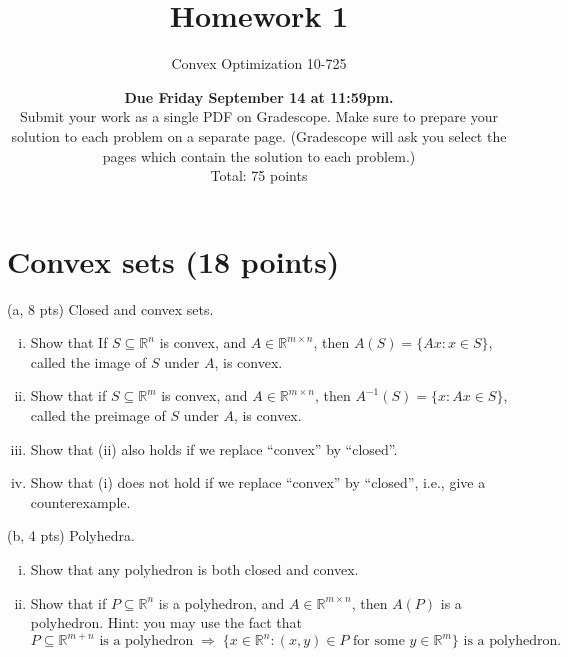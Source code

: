 \documentclass{article}
\theoremstyle{remark}
\theoremstyle{definition}
\def\R{\mathbb{R}}
\begin{document}
\title{Homework 1}
\author{\Large Convex Optimization 10-725}
\date{{\bf Due Friday September 14 at 11:59pm.} \\
\bigskip
Submit your work as a single PDF on Gradescope. Make sure to prepare your
solution to each problem on a separate page. (Gradescope will ask you select the
pages which contain the solution to each problem.) \\  
\bigskip 
Total: 75 points}
\maketitle

\section{Convex sets (18 points)}

\noindent
(a, 8 pts) Closed and convex sets. 

\begin{enumerate}[i.]
\item Show that If $S\subseteq \R^n$ is convex, and $A \in \R^{m \times n}$,
  then $A(S) = \{ Ax : x \in S \}$, called the image of $S$ under $A$, is
  convex.  

\item Show that if $S\subseteq \R^m$ is convex, and $A \in \R^{m \times n}$,
  then $A^{-1}(S) = \{ x : Ax \in S \}$, called the preimage of $S$ under $A$,
  is convex.  

\item Show that (ii) also holds if we replace ``convex'' by ``closed''.

\item Show that (i) does not hold if we replace ``convex'' by ``closed'', i.e.,
  give a counterexample.
\end{enumerate}

\bigskip
\noindent
(b, 4 pts) Polyhedra.

\begin{enumerate}[i.]

\item Show that any polyhedron is both closed and convex.

\item Show that if $P \subseteq \R^n$ is a polyhedron, and $A \in \R^{m \times
    n}$, then $A(P)$ is a polyhedron. Hint: you may use the fact that 
$$
\text{$P \subseteq \R^{m+n}$ is a polyhedron} 
\; \Rightarrow \;
\text{$\{x\in \R^n : \text{$(x,y)\in P$ for some $y\in\R^m$}\}$ 
is a polyhedron}.
$$
\end{enumerate}
\end{document}
